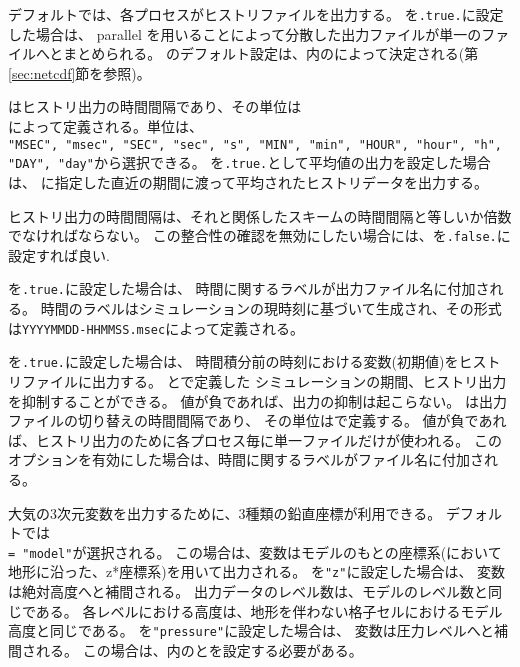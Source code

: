 デフォルトでは、各プロセスがヒストリファイルを出力する。
を\verb|.true.|に設定した場合は、
 parallel \Netcdf を用いることによって分散した出力ファイルが単一のファイルへとまとめられる。
のデフォルト設定は、内のによって決定される(第\ref{sec:netcdf}節を参照)。

はヒストリ出力の時間間隔であり、その単位は\\
によって定義される。単位は、\\
\verb|"MSEC", "msec", "SEC", "sec", "s", "MIN", "min", "HOUR", "hour", "h", "DAY", "day"|から選択できる。
%
を\verb|.true.|として平均値の出力を設定した場合は、
に指定した直近の期間に渡って平均されたヒストリデータを出力する。

ヒストリ出力の時間間隔は、それと関係したスキームの時間間隔と等しいか倍数でなければならない。
この整合性の確認を無効にしたい場合には、を\verb|.false.|に設定すれば良い.

を\verb|.true.|に設定した場合は、
時間に関するラベルが出力ファイル名に付加される。
時間のラベルはシミュレーションの現時刻に基づいて生成され、その形式は\verb|YYYYMMDD-HHMMSS.msec|によって定義される。

を\verb|.true.|に設定した場合は、
時間積分前の時刻における変数(初期値)をヒストリファイルに出力する。
とで定義した
シミュレーションの期間、ヒストリ出力を抑制することができる。
値が負であれば、出力の抑制は起こらない。
は出力ファイルの切り替えの時間間隔であり、
その単位はで定義する。
値が負であれば、ヒストリ出力のために各プロセス毎に単一ファイルだけが使われる。
このオプションを有効にした場合は、時間に関するラベルがファイル名に付加される。

大気の3次元変数を出力するために、3種類の鉛直座標が利用できる。
デフォルトでは\\
 \verb|= "model"|が選択される。
この場合は、変数はモデルのもとの座標系({\scalerm}において地形に沿った、z*座標系)を用いて出力される。
を\verb|"z"|に設定した場合は、 変数は絶対高度へと補間される。
出力データのレベル数は、モデルのレベル数と同じである。
各レベルにおける高度は、地形を伴わない格子セルにおけるモデル高度と同じである。
を\verb|"pressure"|に設定した場合は、
変数は圧力レベルへと補間される。
この場合は、内のとを設定する必要がある。

